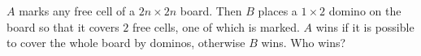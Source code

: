 $A$ marks any free cell of a $2n \times 2n$ board. Then $B$ places a $1 \times 2$ domino on the board so that it covers $2$ free cells, one of which is marked. $A$ wins if it is possible to cover the whole board by dominos, otherwise $B$ wins. Who wins?
